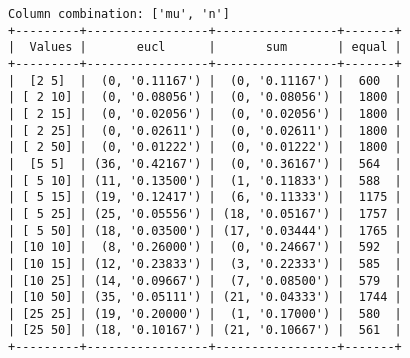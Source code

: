 \documentclass{article}
\begin{document}
\begin{verbatim}
Column combination: ['mu', 'n']
+---------+-----------------+-----------------+-------+
|  Values |       eucl      |       sum       | equal |
+---------+-----------------+-----------------+-------+
|  [2 5]  |  (0, '0.11167') |  (0, '0.11167') |  600  |
| [ 2 10] |  (0, '0.08056') |  (0, '0.08056') |  1800 |
| [ 2 15] |  (0, '0.02056') |  (0, '0.02056') |  1800 |
| [ 2 25] |  (0, '0.02611') |  (0, '0.02611') |  1800 |
| [ 2 50] |  (0, '0.01222') |  (0, '0.01222') |  1800 |
|  [5 5]  | (36, '0.42167') |  (0, '0.36167') |  564  |
| [ 5 10] | (11, '0.13500') |  (1, '0.11833') |  588  |
| [ 5 15] | (19, '0.12417') |  (6, '0.11333') |  1175 |
| [ 5 25] | (25, '0.05556') | (18, '0.05167') |  1757 |
| [ 5 50] | (18, '0.03500') | (17, '0.03444') |  1765 |
| [10 10] |  (8, '0.26000') |  (0, '0.24667') |  592  |
| [10 15] | (12, '0.23833') |  (3, '0.22333') |  585  |
| [10 25] | (14, '0.09667') |  (7, '0.08500') |  579  |
| [10 50] | (35, '0.05111') | (21, '0.04333') |  1744 |
| [25 25] | (19, '0.20000') |  (1, '0.17000') |  580  |
| [25 50] | (18, '0.10167') | (21, '0.10667') |  561  |
+---------+-----------------+-----------------+-------+
\end{verbatim}
\end{document}
